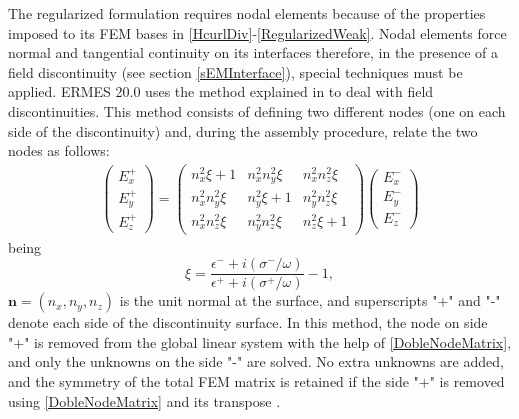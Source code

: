 The regularized formulation requires nodal elements because of the properties imposed to its FEM bases in \ref{HcurlDiv}-\ref{RegularizedWeak}. Nodal elements force normal and tangential continuity on its interfaces therefore, in the presence of a field discontinuity (see section \ref{sEMInterface}), special techniques must be applied. ERMES 20.0 uses the method explained in \cite{DobleNodo} to deal with field discontinuities. This method consists of defining two different nodes (one on each side of the discontinuity) and, during the assembly procedure, relate the two nodes as follows:
\begin{equation}\label{DobleNodeMatrix}
	\begin{aligned}
		\left(\begin{array}{c}
			E_{x}^{+}\\
			E_{y}^{+}\\
			E_{z}^{+}
		\end{array}\right) =
		\left(\begin{array}{lll}
			n_{x}^{2}\xi+1            & n_{x}^{2}n_{y}^{2}\xi     & n_{x}^{2}n_{z}^{2}\xi  \\
			n_{x}^{2}n_{y}^{2}\xi     & n_{y}^{2}\xi+1            & n_{y}^{2}n_{z}^{2}\xi  \\
			n_{x}^{2}n_{z}^{2}\xi     & n_{y}^{2}n_{z}^{2}\xi     &
			n_{z}^{2}\xi+1
		\end{array}\right)
		\left(\begin{array}{c}
			E_{x}^{-}\\
			E_{y}^{-}\\
			E_{z}^{-}
		\end{array}\right)
	\end{aligned}
\end{equation}
being
\[
\xi = \frac{\epsilon^{-} + i\left(\sigma^{-}/\omega\right)}{\epsilon^{+} + i\left(\sigma^{+}/\omega\right)} - 1,
\]
$\mathbf{n} = (n_{x},n_{y},n_{z})$ is the unit normal at the surface, and superscripts "+" and "-" denote each side of the discontinuity surface. In this method, the node on side "+" is removed from the global linear system with the help of \eqref{DobleNodeMatrix}, and only the unknowns on the side "-" are solved. No extra unknowns are added, and the symmetry of the total FEM matrix is retained if the side "+" is removed using \eqref{DobleNodeMatrix} and its transpose \cite{PotencialNodalFormulation}.

